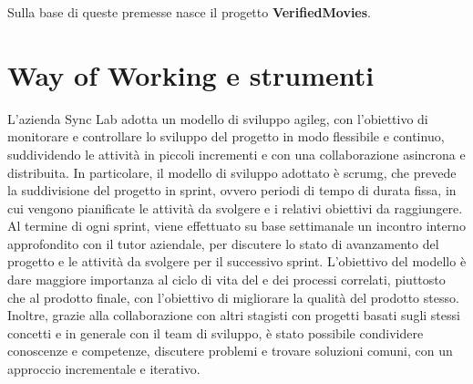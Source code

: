 Sulla base di queste premesse nasce il progetto \textbf{VerifiedMovies}.

\section{Way of Working e strumenti}
L'azienda Sync Lab adotta un modello di sviluppo \gls{agileg}, con l'obiettivo di monitorare e controllare lo sviluppo del progetto in modo flessibile e continuo, suddividendo le attività
in piccoli incrementi e con una collaborazione asincrona e distribuita. In particolare, il modello di sviluppo adottato è \gls{scrumg}, che prevede la suddivisione del progetto in sprint,
ovvero periodi di tempo di durata fissa, in cui vengono pianificate le attività da svolgere e i relativi obiettivi da raggiungere. Al termine di ogni sprint, viene effettuato su base settimanale
un incontro interno approfondito con il tutor aziendale, per discutere lo stato di avanzamento del progetto e le attività da svolgere per il successivo sprint. 
L'obiettivo del modello è dare maggiore importanza al ciclo di vita del  e dei processi correlati, piuttosto che al prodotto finale, con l'obiettivo di migliorare la qualità del prodotto stesso.
Inoltre, grazie alla collaborazione con altri stagisti con progetti basati sugli stessi concetti e in generale con il team di sviluppo, è stato possibile condividere conoscenze e competenze,
discutere problemi e trovare soluzioni comuni, con un approccio incrementale e iterativo. \\

